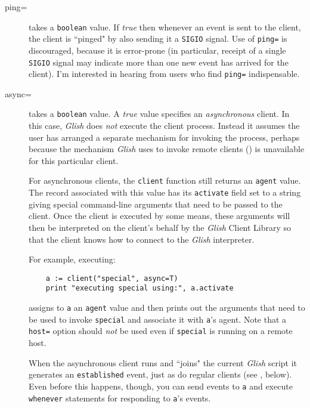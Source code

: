 \begin{description}
\item[ping=]
takes a {\tt boolean} value.  If {\em true} then whenever
an event is sent to the client, the client is ``pinged" by also
sending it a {\tt SIGIO} signal.  Use of {\tt ping=} is 
discouraged, because
it is error-prone (in particular, receipt of a single {\tt SIGIO} signal
may indicate more than one new event has arrived for the client).  I'm
interested in hearing from users who find {\tt ping=} indispensable.

\item[async=]
takes a {\tt boolean} value.  A {\em true} value specifies
an {\em asynchronous} client.  In this case, {\em Glish} 
does {\em not} execute
the client process.  Instead it assumes the user has arranged
a separate mechanism for invoking the process, perhaps because the mechanism
{\em Glish} uses to invoke remote clients () is unavailable for
this particular client.

For asynchronous clients, the {\tt client} function still returns an
{\tt agent} value.  The record associated with this value has its
{\tt activate} field set to a string giving special command-line
arguments that need to be passed to the client.  Once the client is
executed by some means, these arguments will then be interpreted on
the client's behalf by the {\em Glish} Client Library so that the client
knows how to connect to the {\em Glish} interpreter.

For example, executing:
\begin{verbatim}
    a := client("special", async=T)
    print "executing special using:", a.activate
\end{verbatim}
assigns to {\tt a} an {\tt agent} value and then prints out the
arguments that need to be used to invoke {\tt special} and associate
it with {\tt a}'s agent.  Note that a {\tt host=} option should {\em not}
be used even if {\tt special} is running on a remote host.

When the asynchronous client runs and ``joins" the current {\em Glish}
script it generates an {\tt established} event, just as do regular
clients (see , below).  Even before this
happens, though, you can send events to {\tt a} and execute
{\tt whenever} statements for responding to {\tt a}'s events.

\end{description}

